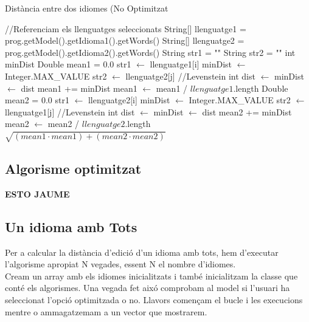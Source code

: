 \documentclass[conference]{IEEEtran}
\begin{document}
 \begin{algorithm}
     \caption{Distància entre dos idiomes (No Optimitzat}
 
 \begin{algorithmic}
    \State //Referenciam els llenguatges seleccionats
    \State String[] llenguatge1 = prog.getModel().getIdioma1().getWords()
    \State String[] llenguatge2 = prog.getModel().getIdioma2().getWords()
    \State
    \State String str1 = ""
    \State String str2 = ""
    \State
    \State int minDist
    \State Double mean1 = 0.0
    \State
        \State str1 $\gets$ llenguatge1[i]
        \State minDist $\gets$ Integer.MAX\_VALUE
            \State str2 $\gets$ llenguatge2[j]
            \State //Levenstein
            \State int dist $\gets$ 
                \State minDist $\gets$ dist
            \EndIf
        \EndFor
        \State
        \State mean1 += minDist
    \EndFor
    \State mean1 $\gets$ mean1 / $llenguatge1$.length
    \State
    \State Double mean2 = 0.0
    \State
        \State str1 $\gets$ llenguatge2[i]
        \State minDist $\gets$ Integer.MAX\_VALUE
            \State str2 $\gets$ llenguatge1[j]
            \State //Levenstein
            \State int dist $\gets$ 
                \State minDist $\gets$ dist
            \EndIf
        \EndFor
        \State
        \State mean2 += minDist
    \EndFor
    \State mean2 $\gets$ mean2 / $llenguatge2$.length
    \State
    \State \Return $\sqrt{(mean1 \cdot mean1) + (mean2 \cdot mean2)}$
\EndFunction
\end{algorithmic}
\end{algorithm}

 \subsection{Algorisme optimitzat}
 \textbf{ESTO JAUME}
 \subsection{Un idioma amb Tots}
 Per a calcular la distància d'edició d'un idioma amb tots, hem d'executar l'algorisme apropiat N vegades, essent N el nombre d'idiomes.\\
 Cream un array amb els idiomes inicialitzats i també inicialitzam la classe que conté els algorismes. Una vegada fet aixó comprobam al model si l'usuari ha seleccionat l'opció optimitzada o no. Llavors començam el bucle i les execucions mentre o ammagatzemam a un vector que mostrarem.
\end{document}

